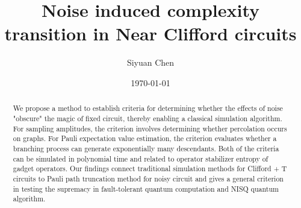\documentclass[aps,%
twocolumn,%
floatfix,%
pra,%
amsfonts,%
longbibliography,%
groupedaddress,%
superscriptaddress]{revtex4-2}%
\newcommand{\1}{\mathbbm{1}}
\begin{document}
\title{Noise induced complexity transition in Near Clifford circuits}
\author{Siyuan Chen}
%


\begin{abstract}
\noindent 
We propose a method to establish criteria for determining whether the effects of noise "obscure" the magic of fixed circuit, thereby enabling a classical simulation algorithm.
For sampling amplitudes, the criterion involves determining whether percolation occurs on graphs. 
For Pauli expectation value estimation, the criterion evaluates whether a branching process can generate exponentially many descendants.
Both of the criteria can be simulated in polynomial time and related to operator stabilizer entropy of gadget operators.
Our findings connect traditional simulation methods for Clifford + T circuits to Pauli path truncation method for noisy circuit and gives a general criterion in testing the supremacy in fault-tolerant quantum computation and NISQ quantum algorithm.
\end{abstract}
\date{\today}
\maketitle

\end{document}
